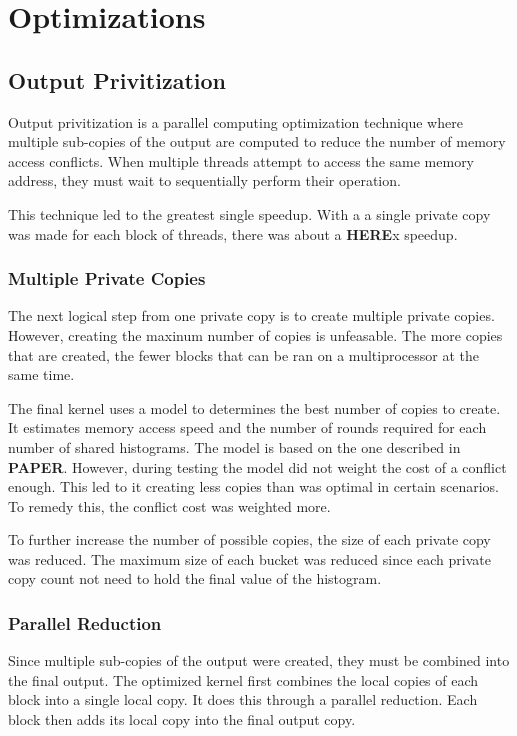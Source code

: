 \section{Optimizations}
\subsection{Output Privitization}
\hspace{\parindent}Output privitization is a parallel computing optimization technique where multiple sub-copies of the output are computed to reduce the number of memory access conflicts. When multiple threads attempt to access the same memory address, they must wait to sequentially perform their operation. 

This technique led to the greatest single speedup. With a a single private copy was made for each block of threads, there was about a \textbf{HERE}x speedup.
 
\subsubsection{Multiple Private Copies}
\hspace{\parindent}The next logical step from one private copy is to create multiple private copies. However, creating the maxinum number of copies is unfeasable. The more copies that are created, the fewer blocks that can be ran on a multiprocessor at the same time. 

The final kernel uses a model to determines the best number of copies to create. It estimates memory access speed and the number of rounds required for each number of shared histograms. The model is based on the one described in \textbf{PAPER}. However, during testing the model did not weight the cost of a conflict enough. This led to it creating less copies than was optimal in certain scenarios. To remedy this, the conflict cost was weighted more.

To further increase the number of possible copies, the size of each private copy was reduced. The maximum size of each bucket was reduced since each private copy count not need to hold the final value of the histogram.
\subsubsection{Parallel Reduction}
\hspace{\parindent}Since multiple sub-copies of the output were created, they must be combined into the final output. The optimized kernel first combines the local copies of each block into a single local copy. It does this through a parallel reduction. Each block then adds its local copy into the final output copy.

